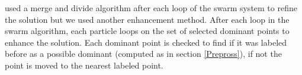\cite{PolygonApproximationPSO} used a merge and divide algorithm after each loop of the swarm system to refine the solution but we used another enhancement method. After each loop in the swarm algorithm, each particle loops on the set of selected dominant points to enhance the solution. Each dominant point is checked to find if it was labeled before as a possible dominant (computed as in section \ref{Prepross}), if not the point is moved to the nearest labeled point.    
